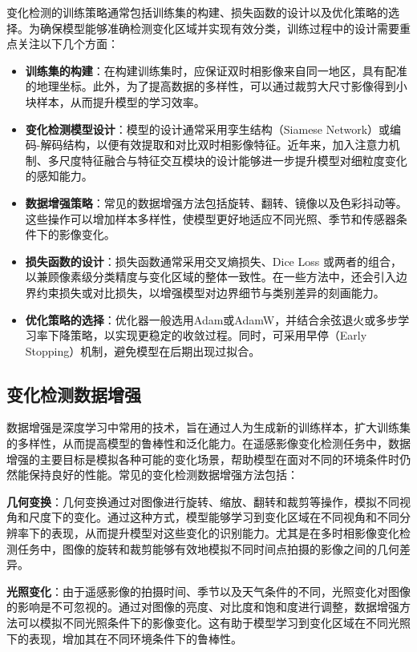 变化检测的训练策略通常包括训练集的构建、损失函数的设计以及优化策略的选择。为确保模型能够准确检测变化区域并实现有效分类，训练过程中的设计需要重点关注以下几个方面：
\begin{itemize}
 \item \textbf{训练集的构建}：在构建训练集时，应保证双时相影像来自同一地区，具有配准的地理坐标。此外，为了提高数据的多样性，可以通过裁剪大尺寸影像得到小块样本，从而提升模型的学习效率。
 
 \item \textbf{变化检测模型设计}：模型的设计通常采用孪生结构（Siamese Network）或编码-解码结构，以便有效提取和对比双时相影像特征。近年来，加入注意力机制、多尺度特征融合与特征交互模块的设计能够进一步提升模型对细粒度变化的感知能力。
 
 \item \textbf{数据增强策略}：常见的数据增强方法包括旋转、翻转、镜像以及色彩抖动等。这些操作可以增加样本多样性，使模型更好地适应不同光照、季节和传感器条件下的影像变化。
 
 \item \textbf{损失函数的设计}：损失函数通常采用交叉熵损失、Dice Loss 或两者的组合，以兼顾像素级分类精度与变化区域的整体一致性。在一些方法中，还会引入边界约束损失或对比损失，以增强模型对边界细节与类别差异的刻画能力。
 
 \item \textbf{优化策略的选择}：优化器一般选用Adam或AdamW，并结合余弦退火或多步学习率下降策略，以实现更稳定的收敛过程。同时，可采用早停（Early Stopping）机制，避免模型在后期出现过拟合。
\end{itemize}


\subsection{变化检测数据增强}
数据增强是深度学习中常用的技术，旨在通过人为生成新的训练样本，扩大训练集的多样性，从而提高模型的鲁棒性和泛化能力。在遥感影像变化检测任务中，数据增强的主要目标是模拟各种可能的变化场景，帮助模型在面对不同的环境条件时仍然能保持良好的性能。常见的变化检测数据增强方法包括：

\textbf{几何变换}：几何变换通过对图像进行旋转、缩放、翻转和裁剪等操作，模拟不同视角和尺度下的变化。通过这种方式，模型能够学习到变化区域在不同视角和不同分辨率下的表现，从而提升模型对这些变化的识别能力。尤其是在多时相影像变化检测任务中，图像的旋转和裁剪能够有效地模拟不同时间点拍摄的影像之间的几何差异。

\textbf{光照变化}：由于遥感影像的拍摄时间、季节以及天气条件的不同，光照变化对图像的影响是不可忽视的。通过对图像的亮度、对比度和饱和度进行调整，数据增强方法可以模拟不同光照条件下的影像变化。这有助于模型学习到变化区域在不同光照下的表现，增加其在不同环境条件下的鲁棒性。

